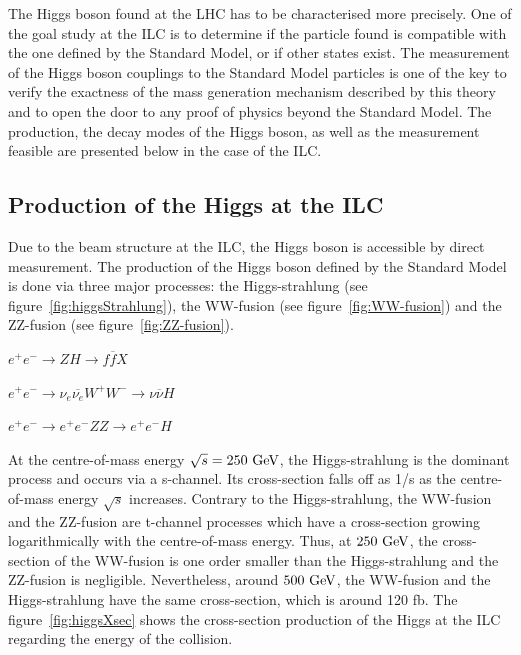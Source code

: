   The Higgs boson found at the \gls{LHC} has to be characterised more precisely.
  One of the goal study at the \gls{ILC} is to determine if the particle found is compatible with the one defined by the Standard Model, or if other states exist.
  The measurement of the Higgs boson couplings to the Standard Model particles is one of the key to verify the exactness of the mass generation mechanism described by this theory and to open the door to any proof of physics beyond the Standard Model.
  The production, the decay modes of the Higgs boson, as well as the measurement feasible are presented below in the case of the \gls{ILC}.

    \subsection{Production of the Higgs at the ILC}

    Due to the beam structure at the \gls{ILC}, the Higgs boson is accessible by direct measurement.
    The production of the Higgs boson defined by the Standard Model is done via three major processes: the Higgs-strahlung (see figure~\ref{fig:higgsStrahlung}), the WW-fusion (see figure~\ref{fig:WW-fusion}) and the ZZ-fusion (see figure~\ref{fig:ZZ-fusion}).

    \begin{description}
      \centering
      \item[Higgs-strahlung:] $e^+e^- \rightarrow ZH \rightarrow f\overline{f}X$
      \item[WW-fusion:] $e^+e^- \rightarrow \nu_{e} \overline{\nu_{e}} W^+W^- \rightarrow \nu \overline{\nu} H$
      \item[ZZ-fusion:] $e^+e^- \rightarrow e^+e^- ZZ \rightarrow e^+e^- H$
    \end{description}


    At the centre-of-mass energy $\sqrt{s} = 250~\rm{GeV}$, the Higgs-strahlung is the dominant process and occurs via a s-channel. 
    Its cross-section falls off as 1/s as the centre-of-mass energy $\sqrt{s}$ increases.
    Contrary to the Higgs-strahlung, the WW-fusion and the ZZ-fusion are t-channel processes which have a cross-section growing logarithmically with the centre-of-mass energy.
    Thus, at $250~\rm{GeV}$, the cross-section of the WW-fusion is one order smaller than the Higgs-strahlung and the ZZ-fusion is negligible.
    Nevertheless, around $500~\rm{GeV}$, the WW-fusion and the Higgs-strahlung have the same cross-section, which is around 120 fb.
    The figure~\ref{fig:higgsXsec} shows the cross-section production of the Higgs at the ILC regarding the energy of the collision.
    
